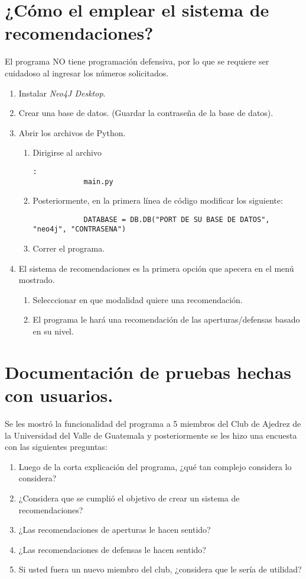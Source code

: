 \documentclass[a4paper,12pt]{article}
\begin{document}
\section{¿Cómo el emplear el sistema de recomendaciones?}
\begin{tcolorbox}[colback=gray!15,colframe=black!1!black,title=ADVERTENCIA]
	El programa NO tiene programación defensiva, por lo que se requiere ser cuidadoso al ingresar los números solicitados. 
	\end{tcolorbox}

\begin{enumerate}
	\item Instalar \textit{Neo4J Desktop}. 
	\item Crear una base de datos. (Guardar la contraseña de la base de datos). 
	\item Abrir los archivos de Python. 
	\begin{enumerate}
		\item Dirigirse al archivo \begin{verbatim}: 
			main.py
		\end{verbatim}
	\item Posteriormente, en la primera línea de código modificar los siguiente: 
		\begin{lstlisting}
			DATABASE = DB.DB("PORT DE SU BASE DE DATOS", "neo4j", "CONTRASENA")	
			\end{lstlisting}
	\item Correr el programa. 
	\end{enumerate}
\item El sistema de recomendaciones es la primera opción que apecera en el menú mostrado. 
\begin{enumerate}
	\item Selecccionar en que modalidad quiere una recomendación.
	\item El programa le hará una recomendación de las aperturas/defensas basado en su nivel.
\end{enumerate}
\end{enumerate}

\section{Documentación de pruebas hechas con usuarios.}

Se les mostró la funcionalidad del programa a 5 miembros del Club de Ajedrez de la Universidad del Valle de Guatemala y posteriormente se les hizo una encuesta con las siguientes preguntas: 
\begin{enumerate}
	\item Luego de la corta explicación del programa, ¿qué tan complejo considera lo considera?
	\item ¿Considera que se cumplió el objetivo de crear un sistema de recomendaciones?
	\item ¿Las recomendaciones de aperturas le hacen sentido?
	\item ¿Las recomendaciones de defensas le hacen sentido?
	\item Si usted fuera un nuevo miembro del club, ¿considera que le sería de utilidad?
\end{enumerate}
\end{document}
